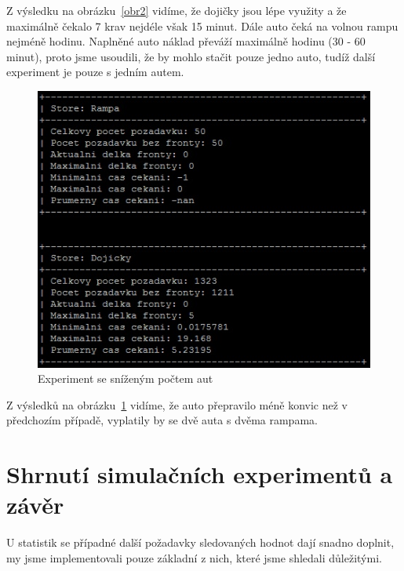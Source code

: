 \documentclass[12pt,a4paper,titlepage,final]{article}
\begin{document}
Z výsledku na obrázku~\ref{obr2} vidíme, že dojičky jsou lépe využity a že maximálně čekalo 7 krav nejdéle však 15 minut. Dále auto čeká na volnou rampu nejméně hodinu. Naplněné auto náklad převáží maximálně hodinu (30 - 60 minut), proto jsme usoudili, že by mohlo stačit pouze jedno auto, tudíž další experiment je pouze s jedním autem.

\begin{figure}[!h] 
 	\centering
	 \includegraphics[]{kravy3.jpg}
\caption{Experiment se sníženým počtem aut}
\label{obr3}
\end{figure}

Z výsledků na obrázku~\ref{obr3} vidíme, že auto přepravilo méně konvic než v předchozím případě, vyplatily by se dvě auta s dvěma rampama.


\section{Shrnutí simulačních experimentů a závěr}
U statistik se případné další požadavky sledovaných hodnot dají snadno doplnit, my jsme implementovali pouze základní z nich, které jsme shledali důležitými.

\newpage



\end{document}
